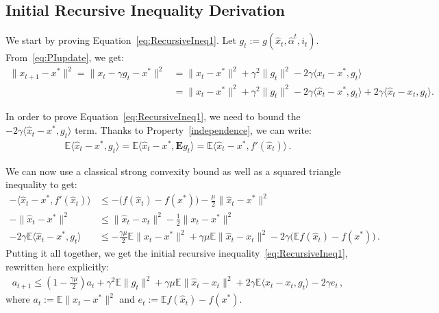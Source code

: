 \documentclass[twoside, 11pt]{article}
\newcommand{\stepsize}{\gamma}
\newcommand{\strongconvex}{\mu}
\newcommand{\E}{\mathbb{E}}
\newcommand{\Econd}{\mathbf{E}}
\begin{document}
\subsection{Initial Recursive Inequality Derivation} \label{app:RecurDerivation}
We start by proving Equation~\eqref{eq:RecursiveIneq1}.
Let $g_t := g(\hat x_t, \hat \alpha^t, i_t)$. From~\eqref{eq:PIupdate}, we get:
\begin{align*}
\|x_{t+1} - x^*\|^2 \nonumber
= \|x_t -\stepsize g_t -x^*\|^2
&= \|x_t -x^*\|^2 + \stepsize^2 \|g_t\|^2 -2\stepsize\langle x_t -x^*,  g_t\rangle
\\
&= \|x_t -x^*\|^2 + \stepsize^2 \|g_t\|^2
	- 2 \stepsize\langle \hat x_t -x^*,  g_t\rangle +2\stepsize\langle \hat x_t -x_t,  g_t\rangle .
\end{align*}

In order to prove Equation~\eqref{eq:RecursiveIneq1}, we need to bound the $- 2 \stepsize\langle \hat x_t -x^*,  g_t\rangle$ term.
Thanks to Property~\ref{independence}, we can write:
\begin{align*}
\E \langle \hat x_t -x^*,  g_t\rangle
= \E \langle \hat x_t -x^*, \Econd g_t \rangle
= \E \langle \hat x_t -x^*,  f'(\hat x_t)\rangle  \, .
\end{align*}

We can now use a classical strong convexity bound as well as a squared triangle inequality to get:
\begin{align}
- \langle \hat x_t -x^*,  f'(\hat x_t)\rangle &\leq - \big(f(\hat x_t) -f(x^*)\big) -\frac{\strongconvex}{2}\|\hat x_t - x^*\|^2
\tag*{(Strong convexity bound)} \nonumber \\
- \|\hat x_t - x^*\|^2 &\leq \|\hat x_t - x_t\|^2 - \frac{1}{2} \|x_t - x^*\|^2
\tag*{($\|a+b\|^2 \leq 2 \|a\|^2 + 2 \|b\|^2$)} \nonumber \\
- 2 \stepsize \E \langle \hat x_t -x^*,  g_t\rangle &\leq
	- \frac{\stepsize \strongconvex}{2} \E \|x_t - x^*\|^2
	+ \stepsize \strongconvex \E \|\hat x_t - x_t\|^2
	-2 \stepsize \big(\E f(\hat x_t) - f(x^*)\big)  \, .
\end{align}
Putting it all together, we get the initial recursive inequality~\eqref{eq:RecursiveIneq1}, rewritten here explicitly:
\begin{align}
a_{t+1} \leq
	(1 -\frac{\stepsize \strongconvex}{2}) a_t
	+ \stepsize^2 \E \|g_t\|^2
	+ \stepsize\strongconvex \E\|\hat x_t - x_t\|^2
	+ 2\stepsize \E \langle \hat x_t -x_t,  g_t\rangle
	-2\stepsize e_t  \, ,
\end{align}
where $a_t := \E \|x_t - x^*\|^2$ and $e_t := \E f(\hat x_t) - f(x^*)$.
\end{document}
